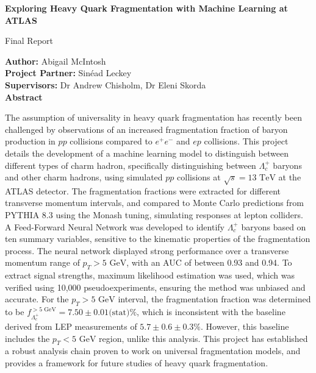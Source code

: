 \documentclass[12pt]{article}
\begin{document}
\begin{titlepage}
    \begin{center}
        \vspace*{1cm}
        \Huge
        \textbf{Exploring Heavy Quark Fragmentation with Machine Learning at ATLAS}

        \vspace{0.5cm}
        \LARGE
        Final Report

        \vspace{1.5cm}
        \large
        \textbf{Author: } Abigail McIntosh \\
        \textbf{Project Partner:} Sinéad Leckey \\
        \textbf{Supervisors:} Dr Andrew Chisholm, Dr Eleni Skorda \\

        \vspace{1.0cm}
        \textbf{Abstract}

        \vspace{0.2cm}
        \begin{minipage}{0.9\textwidth}
            \small
            The assumption of universality in heavy quark fragmentation has recently been challenged by observations of an increased fragmentation fraction of baryon production in $pp$ collisions compared to $e^+e^-$ and $ep$ collisions. This project details the development of a machine learning model to distinguish between different types of charm hadron, specifically distinguishing between $\Lambda_c^+$ baryons and other charm hadrons, using simulated $pp$ collisions at $\sqrt{s} = 13 \text{ TeV}$ at the ATLAS detector. The fragmentation fractions were extracted for different transverse momentum intervals, and compared to Monte Carlo predictions from PYTHIA 8.3 using the Monash tuning, simulating responses at lepton colliders. A Feed-Forward Neural Network was developed to identify $\Lambda_c^+$ baryons based on ten summary variables, sensitive to the kinematic properties of the fragmentation process. The neural network displayed strong performance over a transverse momentum range of $p_T > 5 \text{ GeV}$, with an AUC of between 0.93 and 0.94. To extract signal strengths, maximum likelihood estimation was used, which was verified using 10,000 pseudoexperiments, ensuring the method was unbiased and accurate. For the $p_T > 5 \text{ GeV}$ interval, the fragmentation fraction was determined to be $f_{\Lambda_c^+}^{>5 \text{ GeV}} = 7.50 \pm 0.01 \text{(stat)} \%$, which is inconsistent with the baseline derived from LEP measurements of $5.7 \pm 0.6 \pm 0.3 \%$. However, this baseline includes the $p_T < 5 \text{ GeV}$ region, unlike this analysis. This project has established a robust analysis chain proven to work on universal fragmentation models, and provides a framework for future studies of heavy quark fragmentation.
        \end{minipage}
        \vfill



\end{center}
\end{titlepage}
\end{document}
